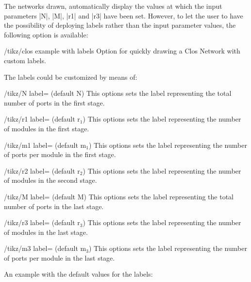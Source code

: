 \documentclass{ltxdoc}
\begin{document}
The networks drawn, automatically display the values at which the input parameters |N|, |M|, |r1| and |r3| have been set. However, to let the user to have the possibility of deploying labels rather than the input parameter values, the following option is available:

\begin{key}{/tikz/clos example with labels}
    Option for quickly drawing a Clos Network with custom labels.
\end{key}

The labels could be customized by means of:
\begin{key}{/tikz/N label= (default N)}
    This options sets the label representing the total number of ports in the first stage.
\end{key}

\begin{key}{/tikz/r1 label= (default r$_1$)}
    This options sets the label representing the number of modules in the first stage.
\end{key}

\begin{key}{/tikz/m1 label= (default m$_1$)}
    This options sets the label representing the number of ports per module in the first stage.
\end{key}

\begin{key}{/tikz/r2 label= (default r$_2$)}
    This options sets the label representing the number of modules in the second stage.
\end{key}

\begin{key}{/tikz/M label= (default M)}
    This options sets the label representing the total number of ports in the last stage.
\end{key}

\begin{key}{/tikz/r3 label= (default r$_3$)}
    This options sets the label representing the number of modules in the last stage.
\end{key}

\begin{key}{/tikz/m3 label= (default m$_3$)}
    This options sets the label representing the number of ports per module in the last stage.
\end{key}

An example with the default values for the labels:
\end{document}
